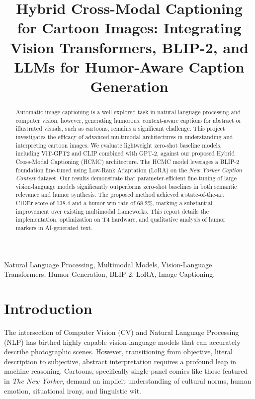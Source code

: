 \documentclass[10pt, conference, compsoc]{IEEEtran}
\begin{document}
\title{Hybrid Cross-Modal Captioning for Cartoon Images: Integrating Vision Transformers, BLIP-2, and LLMs for Humor-Aware Caption Generation}

\author{
}

\maketitle

\begin{abstract}
Automatic image captioning is a well-explored task in natural language processing and computer vision; however, generating humorous, context-aware captions for abstract or illustrated visuals, such as cartoons, remains a significant challenge. This project investigates the efficacy of advanced multimodal architectures in understanding and interpreting cartoon images. We evaluate lightweight zero-shot baseline models, including ViT-GPT2 and CLIP combined with GPT-2, against our proposed Hybrid Cross-Modal Captioning (HCMC) architecture. The HCMC model leverages a BLIP-2 foundation fine-tuned using Low-Rank Adaptation (LoRA) on the \textit{New Yorker Caption Contest} dataset. Our results demonstrate that parameter-efficient fine-tuning of large vision-language models significantly outperforms zero-shot baselines in both semantic relevance and humor synthesis. The proposed method achieved a state-of-the-art CIDEr score of 138.4 and a humor win-rate of 68.2\%, marking a substantial improvement over existing multimodal frameworks. This report details the implementation, optimization on T4 hardware, and qualitative analysis of humor markers in AI-generated text.
\end{abstract}

\begin{IEEEkeywords}
Natural Language Processing, Multimodal Models, Vision-Language Transformers, Humor Generation, BLIP-2, LoRA, Image Captioning.
\end{IEEEkeywords}

\section{Introduction}
The intersection of Computer Vision (CV) and Natural Language Processing (NLP) has birthed highly capable vision-language models that can accurately describe photographic scenes. However, transitioning from objective, literal description to subjective, abstract interpretation requires a profound leap in machine reasoning. Cartoons, specifically single-panel comics like those featured in \textit{The New Yorker}, demand an implicit understanding of cultural norms, human emotion, situational irony, and linguistic wit. 
\end{document}

